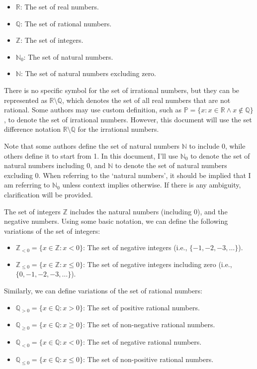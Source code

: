 \documentclass[a4paper, twoside]{article}
\newcommand{\R}{\mathbb{R}}
\newcommand{\Q}{\mathbb{Q}}
\newcommand{\Z}{\mathbb{Z}}
\newcommand{\N}{\mathbb{N}}
\begin{document}
\begin{itemize}
    \item \(\R\): The set of real numbers.
    \item \(\Q\): The set of rational numbers.
    \item \(\Z\): The set of integers.
    \item \(\N_0\): The set of natural numbers.
    \item \(\N\): The set of natural numbers excluding zero.
\end{itemize}

There is no specific symbol for the set of irrational numbers, but they can be represented as \(\R \setminus \Q\), which denotes the set of all real numbers that are not rational. Some authors may use custom definition, such as \(\mathbb{P} = \{ x : x \in \R \land x \notin \Q \}\), to denote the set of irrational numbers. However, this document will use the set difference notation \(\R \setminus \Q\) for the irrational numbers.

Note that some authors define the set of natural numbers \(\N\) to include 0, while others define it to start from 1. In this document, I'll use \(\N_0\) to denote the set of natural numbers including 0, and \(\N\) to denote the set of natural numbers excluding 0. When referring to the `natural numbers', it should be implied that I am referring to \(\N_0\) unless context implies otherwise. If there is any ambiguity, clarification will be provided.

The set of integers \(\Z\) includes the natural numbers (including 0), and the negative numbers. Using some basic notation, we can define the following variations of the set of integers:

\begin{itemize}
    \item \( \Z_{<0} = \{ x \in \Z : x < 0 \} \): The set of negative integers (i.e., \( \{-1, -2, -3, \ldots\} \)).
    \item \( \Z_{\leq 0} = \{ x \in \Z : x \leq 0 \} \): The set of negative integers including zero (i.e., \( \{0, -1, -2, -3, \ldots\} \)).
\end{itemize}

Similarly, we can define variations of the set of rational numbers:


\begin{itemize}
    \item \(\Q_{> 0} = \{ x \in \Q : x > 0 \}\): The set of positive rational numbers.
    \item \(\Q_{\geq 0} = \{ x \in \Q : x \geq 0 \}\): The set of non-negative rational numbers.
    \item \(\Q_{< 0} = \{ x \in \Q : x < 0 \}\): The set of negative rational numbers.
    \item \(\Q_{\leq 0} = \{ x \in \Q : x \leq 0 \}\): The set of non-positive rational numbers.
\end{itemize}
\end{document}
